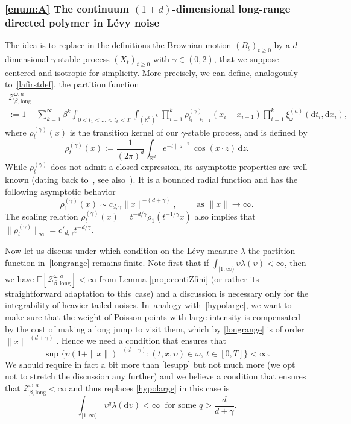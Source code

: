 \documentclass[11pt]{article}
\newcommand{\Subsubsection}{\subsubsection}
\numberwithin{equation}{section}
\let\mathcal\mathscr
\let\sep:
\theoremstyle{definition}
\newcommand{\dd}{\mathrm{d}}
\newcommand{\R}{\mathbb{R}}
\newcommand{\cZ}{{\ensuremath{\mathcal Z}} }
\newcommand{\bbE}{{\ensuremath{\mathbb E}} }
\newcommand{\bbR}{{\ensuremath{\mathbb R}} }
\let\gb\beta
\let\gl\lambda
\let\ups\upsilon
\let\go\omega
\begin{document}
\Subsubsection*{\eqref{enum:A} The continuum $(1+d)$-dimensional long-range directed polymer in Lévy noise}
The idea is to replace in the definitions the
Brownian motion $(B_t)_{t\geq 0}$
by a $d$\nobreakdash-dimen\-sional $\gamma$-stable process $(X_t)_{t\geq 0}$ with $\gamma\in (0,2)$, that we suppose centered and isotropic for simplicity. More precisely, we can define, analogously to~\eqref{lafirstdef}, the partition function\vspace*{-5pt}
\begin{multline}
\label{longrange}
\cZ_{\gb,\mathrm{long}}^{\go,a}\\[-5pt]
:= 1+\sum_{k=1}^\infty \beta^k\int_{0<t_1<\dots<t_k<T}\int_{(\bbR^d)^k} \prod_{i=1}^k \rho^{(\gamma)}_{t_i-t_{i-1}} (x_i-x_{i-1}) \prod_{i=1}^k \xi_{\go}^{(a)} (\dd t_i, \dd x_i),
\end{multline}
where $\rho_{t}^{(\gamma)}(x)$ is the transition kernel
of our $\gamma$-stable process, and is defined by
\[
\rho_t^{(\gamma)}(x) := \frac{1}{(2\pi)^d} \int_{\R^d} e^{-t \|z\|^{\gamma}} \cos(x \cdot z) \,\dd z.
\]
While $\rho_t^{(\gamma)}$ does not admit a closed expression, its asymptotic properties are well known (dating back to~\cite{K70}, see also~\cite[Ch.\,2]{ST94}).
It is a bounded radial function and has
the following asymptotic behavior
\begin{equation}\label{thetail}
\rho_1^{(\gamma)} (x) \sim c_{d,\gamma} \|x\|^{-(d+\gamma)},
\qquad \text{ as }
\| x\|\to \infty.
\end{equation}
The scaling relation
$\rho_{t}^{(\gamma)}(x) = t^{-d/\gamma} \rho_1(t^{-1/\gamma} x)$
also implies that $\|\rho_{t}^{(\gamma)} \|_{\infty}= c'_{d,\gamma} t^{-d/\gamma}.$

Now let us discuss under which condition on the Lévy measure $\gl$ the partition function in~\eqref{longrange} remains finite. Note first that if $\int_{[1,\infty)} \ups \gl(\ups)<\infty$, then we have $\bbE [ \cZ_{\gb,\mathrm{long}}^{\go,a} ]<\infty$ from Lemma \ref{prop:contiZfini} (or rather its straightforward adaptation to this~case) and a discussion is necessary only for the integrability of heavier-tailed noises.
In~analogy with~\eqref{hypolarge}, we want to make sure that
the weight of Poisson points with large intensity is compensated by the cost of making a long jump to visit them, which by \eqref{longrange} is of order
$\|x\|^{-(d+\gamma)}$. Hence we need a condition that ensures that
\begin{equation}\label{lesupp}
\sup \bigl\{ \ups (1+ \|x\|)^{-(d+\gamma)} \sep (t,x,\ups) \in \go, \ t\in[0,T] \bigr\} <\infty.
\end{equation}
We should require in fact a bit more than \eqref{lesupp} but not much more (we opt not to stretch the discussion any further) and we believe
a condition that ensures that $\cZ_{\gb,\mathrm{long}}^{\go,a}<\infty$ and thus replaces \eqref{hypolarge} in this case is
\begin{equation}
\label{hypolargelongrange}
\int_{[1,\infty)} \ups^{q} \lambda(\dd \ups) <\infty
\ \text{ for some } q> \frac{d}{d+\gamma}.
\end{equation}
\end{document}

